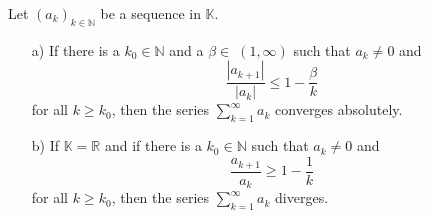 \begin{Theorem} \label{th:raabecrit}
Let $(a_k)_{k\in\mathbb{N}}$ be  a sequence in $\mathbb{K}$.
\begin{itemize}
 \item[a)] If there is a $k_0\in\mathbb{N}$ and a $\beta\in\;(1,\infty)$ such that $a_k\neq 0$ and 
          $$\frac{|a_{k+1}|}{|a_k|} \leq 1-\frac{\beta}{k}$$ for all $k\geq k_0$, 
          then the series $\sum_{k=1}^{\infty}a_k$ converges absolutely.
 \item[b)] If $\mathbb{K}=\mathbb{R}$ and if there is a $k_0\in\mathbb{N}$ such that $a_k\neq 0$ and 
           $$\frac{a_{k+1}}{a_k} \geq 1-\frac{1}{k}$$ for all $k\geq k_0$, 
           then the series $\sum_{k=1}^{\infty}a_k$ diverges.
\end{itemize}
\end{Theorem}

